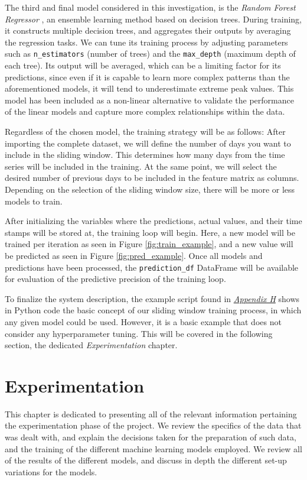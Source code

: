\documentclass[12pt]{report} %
\begin{document}
The third and final model considered in this investigation, is the \textit{Random Forest Regressor} \cite{random_forest_regressor}, an ensemble learning method based on decision trees. During training, it constructs multiple decision trees, and aggregates their outputs by averaging the regression tasks. We can tune its training process by adjusting parameters such as \verb|n_estimators| (number of trees) and the \verb|max_depth| (maximum depth of each tree). Its output will be averaged, which can be a limiting factor for its predictions, since even if it is capable to learn more complex patterns than the aforementioned models, it will tend to underestimate extreme peak values. This model has been included as a non-linear alternative to validate the performance of the linear models and capture more complex relationships within the data.

Regardless of the chosen model, the training strategy will be as follows: After importing the complete dataset, we will define the number of days you want to include in the sliding window. This determines how many days from the time series will be included in the training. At the same point, we will select the desired number of previous days to be included in the feature matrix as columns. Depending on the selection of the sliding window size, there will be more or less models to train.

After initializing the variables where the predictions, actual values, and their time stamps will be stored at, the training loop will begin. Here, a new model will be trained per iteration as seen in Figure \ref{fig:train_example}, and a new value will be predicted as seen in Figure \ref{fig:pred_example}. Once all models and predictions have been processed, the \small{\verb|prediction_df|} DataFrame will be available for evaluation of the predictive precision of the training loop.

To finalize the system description, the example script found in \textit{\hyperref[app:appendix_h_example_basic_training_process]{Appendix H}} shows in Python code the basic concept of our sliding window training process, in which any given model could be used. However, it is a basic example that does not consider any hyperparameter tuning. This will be covered in the following section, the dedicated \textit{Experimentation} chapter.



\chapter{Experimentation}
This chapter is dedicated to presenting all of the relevant information pertaining the experimentation phase of the project. We review the specifics of the data that was dealt with, and explain the decisions taken for the preparation of such data, and the training of the different machine learning models employed. We review all of the results of the different models, and discuss in depth the different set-up variations for the models.
\end{document}
